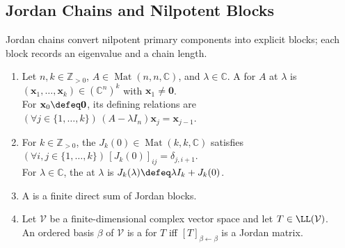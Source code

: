 \subsection{Jordan Chains and Nilpotent Blocks}

Jordan chains convert nilpotent primary components into explicit blocks; each block records an eigenvalue and a chain length.

\begin{definition} \label{def:jordan-chain-block-and-matrix} 
\begin{enumerate}[label=(\roman*)]
\setlength{\itemsep}{0pt}
\item Let $n,k\in\mathbb{Z}_{>0}$, $A\in\operatorname{Mat}(n,n,\mathbb{C})$, and $\lambda\in\mathbb{C}$. A  for $A$ at $\lambda$ is $(\mathbf{x}_1,\ldots,\mathbf{x}_k)\in(\mathbb{C}^n)^k$ with $\mathbf{x}_1\neq\mathbf{0}$.\\
For $\mathbf{x}_0\defeq\mathbf{0}$, its defining relations are $(\forall j\in\{1,\ldots,k\})\,(A-\lambda I_n)\mathbf{x}_j=\mathbf{x}_{j-1}$.
\item For $k\in\mathbb{Z}_{>0}$, the  $J_k(0)\in\operatorname{Mat}(k,k,\mathbb{C})$ satisfies $(\forall i,j\in\{1,\ldots,k\})\,[J_k(0)]_{ij}=\delta_{j,i+1}$.\\
For $\lambda\in\mathbb{C}$, the  at $\lambda$ is $J_k(\lambda)\defeq\lambda I_k+J_k(0)$.
\item A  is a finite direct sum of Jordan blocks.
\item Let $\mathcal{V}$ be a finite-dimensional complex vector space and let $T\in\LL(\mathcal{V})$.\\
An ordered basis $\beta$ of $\mathcal{V}$ is a  for $T$ iff $[T]_{\beta\leftarrow\beta}$ is a Jordan matrix.
\end{enumerate}
\end{definition}

